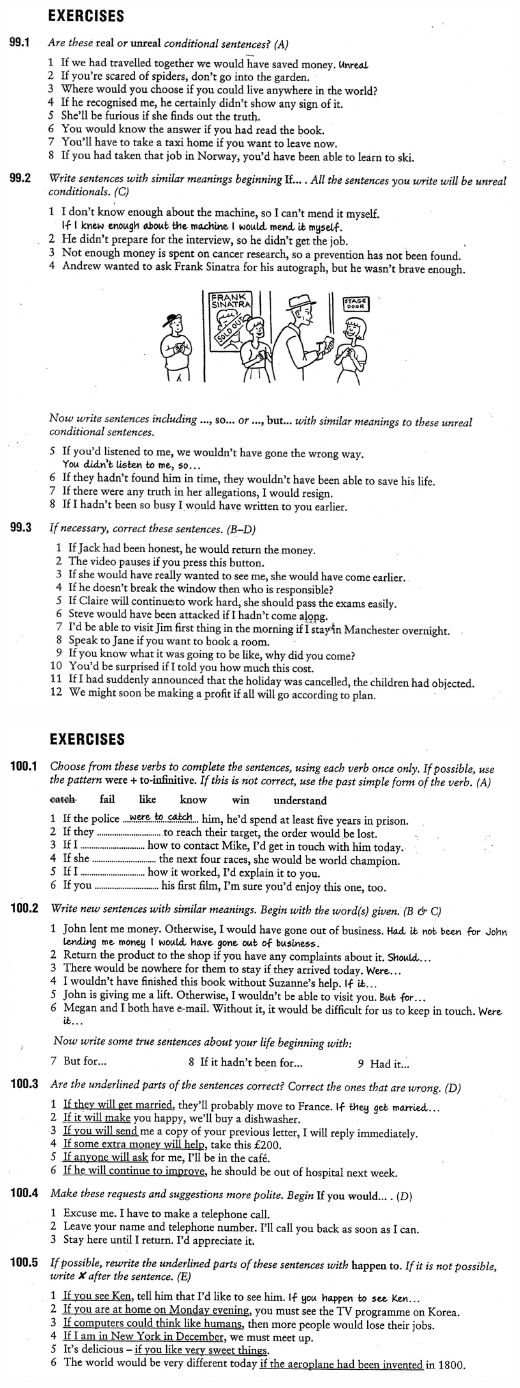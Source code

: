 \includegraphics[scale=.85]{handouts/Eng108.jpg}

\includegraphics[scale=.85]{handouts/Eng109.jpg}

